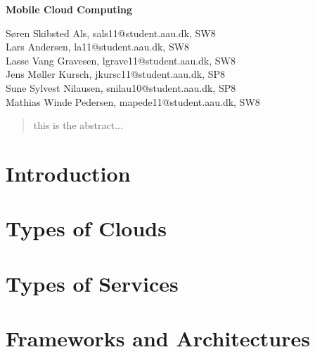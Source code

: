 \documentclass[12pt,a4paper]{article}
\begin{document}
\begin{center}
\bigskip\bigskip
{\Large\bf Mobile Cloud Computing\\}
\bigskip\bigskip


Søren Skibsted Als, sals11@student.aau.dk, SW8\\
Lars Andersen, la11@student.aau.dk, SW8\\
Lasse Vang Gravesen, lgrave11@student.aau.dk, SW8\\
Jens Møller Kursch, jkursc11@student.aau.dk, SP8\\
Sune Sylvest Nilausen, snilau10@student.aau.dk, SP8\\
Mathias Winde Pedersen, mapede11@student.aau.dk, SW8


\bigskip
\begin{abstract}
this is the abstract...
\end{abstract}

\thispagestyle{empty}
\end{center}


\titlepage

\thispagestyle{plain}


\section{Introduction}


\section{Types of Clouds}

\section{Types of Services}

\section{Frameworks and Architectures}

\end{document}
